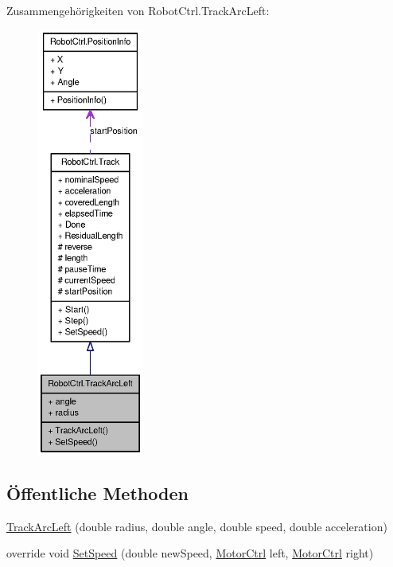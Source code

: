Zusammengehörigkeiten von RobotCtrl.TrackArcLeft:\nopagebreak
\begin{figure}[H]
\begin{center}
\leavevmode
\includegraphics[height=400pt]{class_robot_ctrl_1_1_track_arc_left__coll__graph}
\end{center}
\end{figure}
\subsection*{Öffentliche Methoden}
\begin{DoxyCompactItemize}
\item 
\hyperlink{class_robot_ctrl_1_1_track_arc_left_a405f8fa89cf86603b3696a282d05dcff}{TrackArcLeft} (double radius, double angle, double speed, double acceleration)
\item 
override void \hyperlink{class_robot_ctrl_1_1_track_arc_left_aee8e8c1da176807436c2946e39bbd6ae}{SetSpeed} (double newSpeed, \hyperlink{class_robot_ctrl_1_1_motor_ctrl}{MotorCtrl} left, \hyperlink{class_robot_ctrl_1_1_motor_ctrl}{MotorCtrl} right)
\end{DoxyCompactItemize}
